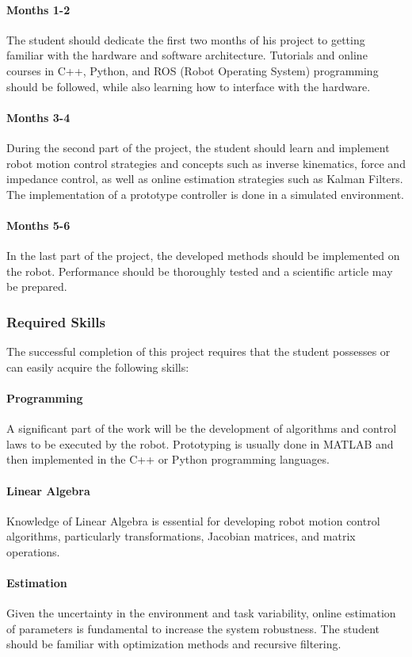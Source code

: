 \paragraph{Months 1-2}
The student should dedicate the first two months of his project to getting familiar with the hardware and software architecture.
Tutorials and online courses in C++, Python, and ROS (Robot Operating System) programming should be followed, while also learning how to interface with the hardware.
\paragraph{Months 3-4}
During the second part of the project, the student should learn and implement robot motion control strategies and concepts such as inverse kinematics, force and impedance control, as well as online estimation strategies such as Kalman Filters.
The implementation of a prototype controller is done in a simulated environment.
\paragraph{Months 5-6}
In the last part of the project, the developed methods should be implemented on the robot. Performance should be thoroughly tested and a scientific article may be prepared.
\subsubsection{Required Skills}
The successful completion of this project requires that the student possesses or can easily acquire the following skills: 
\paragraph{Programming} A significant part of the work will be the development of algorithms and control laws to be executed by the robot. Prototyping is usually done in MATLAB and then implemented in the C++ or Python programming languages.
\paragraph{Linear Algebra} Knowledge of Linear Algebra is essential for developing robot motion control algorithms, particularly  transformations, Jacobian matrices, and matrix operations.
\paragraph{Estimation} Given the uncertainty in the environment and task variability, online estimation of parameters is fundamental to increase the system robustness. The student should be familiar with optimization methods and recursive filtering.

